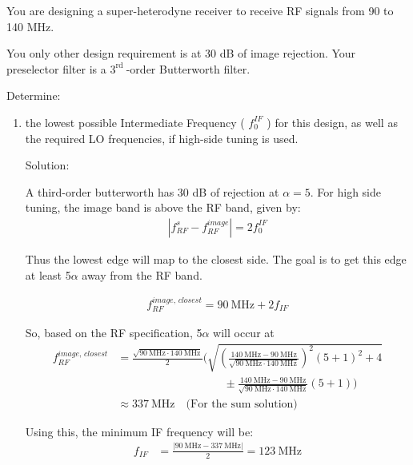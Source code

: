 \begin{homeworkProblem}
    You are designing a super-heterodyne receiver to receive RF signals from 90 to 140 MHz.

    You only other design requirement is at 30 dB of image rejection.
    Your preselector filter is a $3^{\text {rd }}$-order Butterworth filter.

    Determine:
    \begin{enumerate}[1.]
        \item the lowest possible Intermediate Frequency ( $f_0^{I F}$ ) for this design, as well as the required LO frequencies, if high-side tuning is used.
            \begin{callout}{Solution:}

            A third-order butterworth has 30 dB of rejection at $\alpha=5$. For high side tuning, the image band is above the RF band, given by:
            \begin{align*}
                |f_{RF}^{s}-f_{RF}^{image}|=2f_{0}^{IF}
            \end{align*}

            Thus the lowest edge will map to the closest side. The goal is to get this edge at least 5$\alpha$ away from the RF band.

            \begin{align*}
                f_{RF}^{image,\,closest} = 90~\mathrm{MHz}+2f_{IF}
            \end{align*}

            So, based on the RF specification, 5$\alpha$ will occur at
            \begin{align*}
                f_{RF}^{image,\,closest}&=
\frac{\sqrt{90~\mathrm{MHz} \cdot 140~\mathrm{MHz}}}{2}\Bigg(\sqrt{\left(\frac{140~\mathrm{MHz}-90~\mathrm{MHz}}{\sqrt{90~\mathrm{MHz} \cdot 140~\mathrm{MHz}}}\right)^2(5+1)^2+4} \\ 
                                        &\hspace{4cm}\pm \frac{140~\mathrm{MHz}-90~\mathrm{MHz}}{\sqrt{90~\mathrm{MHz} \cdot 140~\mathrm{MHz}}}(5+1)\Bigg) \\
                                        &\approx 337~\mathrm{MHz} \quad \text{(For the sum solution)}
            \end{align*}

            Using this, the minimum IF frequency will be:
            \begin{align*}
                f_{IF} &= \frac{|90\mathrm{~MHz}-337~\mathrm{MHz}|}{2} = 123\mathrm{~MHz}
            \end{align*}


\end{callout}
\end{enumerate}
\end{homeworkProblem}
